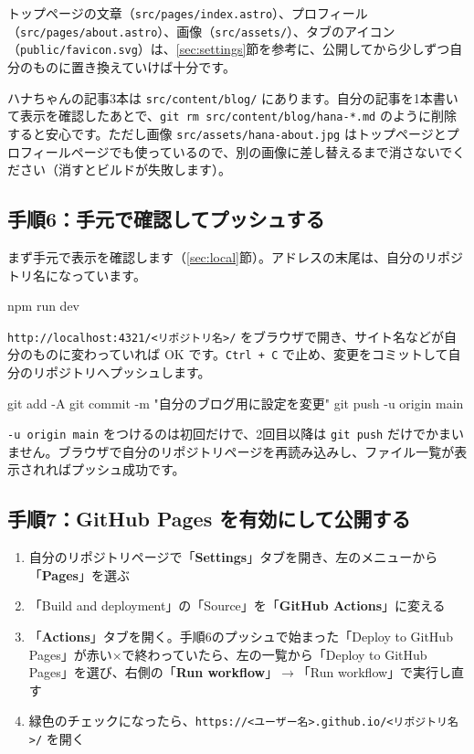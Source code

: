 \documentclass[a4paper,11pt]{ltjsarticle}
\newcommand{\file}[1]{\texttt{#1}}
\begin{document}
トップページの文章（\file{src/pages/index.astro}）、プロフィール（\file{src/pages/about.astro}）、画像（\file{src/assets/}）、タブのアイコン（\file{public/favicon.svg}）は、\ref{sec:settings}節を参考に、公開してから少しずつ自分のものに置き換えていけば十分です。

\begin{hint}[サンプル記事の消し方]
ハナちゃんの記事3本は \file{src/content/blog/} にあります。自分の記事を1本書いて表示を確認したあとで、\file{git rm src/content/blog/hana-*.md} のように削除すると安心です。ただし画像 \file{src/assets/hana-about.jpg} はトップページとプロフィールページでも使っているので、別の画像に差し替えるまで消さないでください（消すとビルドが失敗します）。
\end{hint}

\subsection{手順6：手元で確認してプッシュする}

まず手元で表示を確認します（\ref{sec:local}節）。アドレスの末尾は、自分のリポジトリ名になっています。

\begin{code}
npm run dev
\end{code}

\file{http://localhost:4321/<リポジトリ名>/} をブラウザで開き、サイト名などが自分のものに変わっていれば OK です。\texttt{Ctrl + C} で止め、変更をコミットして自分のリポジトリへプッシュします。

\begin{code}
git add -A
git commit -m "自分のブログ用に設定を変更"
git push -u origin main
\end{code}

\file{-u origin main} をつけるのは初回だけで、2回目以降は \file{git push} だけでかまいません。ブラウザで自分のリポジトリページを再読み込みし、ファイル一覧が表示されればプッシュ成功です。

\subsection{手順7：GitHub Pages を有効にして公開する}

\begin{enumerate}
  \item 自分のリポジトリページで「\textbf{Settings}」タブを開き、左のメニューから「\textbf{Pages}」を選ぶ
  \item 「Build and deployment」の「Source」を「\textbf{GitHub Actions}」に変える
  \item 「\textbf{Actions}」タブを開く。手順6のプッシュで始まった「Deploy to GitHub Pages」が赤い×で終わっていたら、左の一覧から「Deploy to GitHub Pages」を選び、右側の「\textbf{Run workflow}」$\to$「Run workflow」で実行し直す
  \item 緑色のチェックになったら、\file{https://<ユーザー名>.github.io/<リポジトリ名>/} を開く
\end{enumerate}
\end{document}
